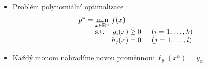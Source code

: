 \documentclass[cmpiitalkstyle, 22pt]{cmptalk}
\newcommand{\R}{\mathbb{R}}
\begin{document}
\begin{cmptalkslide}
  \setlength{\abovedisplayskip}{0.9em}
  \setlength{\belowdisplayskip}{0.9em}

  \begin{itemize}

    \item Problém polynomiální optimalizace
    \begin{align}
      \arraycolsep=1.4pt
      \begin{array}{rclrcl@{\hskip0.5cm}l}
        p^* &=& \displaystyle \min_{x\in\R^n} & \multicolumn{3}{l}{f(x)} \\
        && \text{s.t.} & g_i(x) &\geq& 0 & (i = 1,\ldots,k) \\
        &&& h_j(x) &=& 0 & (j = 1,\ldots,l)
      \end{array}
    \end{align}

    \item Každý monom nahradíme novou proměnnou: $\ell_y(x^\alpha)=y_\alpha$


\end{itemize}
\end{cmptalkslide}
\end{document}
